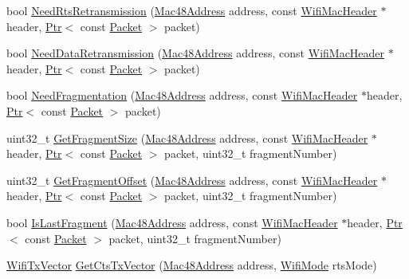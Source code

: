 \begin{DoxyCompactItemize}
\item 
bool \hyperlink{classns3_1_1WifiRemoteStationManager_aca800de3a5d9c62f17ddf1ffb702f105}{Need\+Rts\+Retransmission} (\hyperlink{classns3_1_1Mac48Address}{Mac48\+Address} address, const \hyperlink{classns3_1_1WifiMacHeader}{Wifi\+Mac\+Header} $\ast$header, \hyperlink{classns3_1_1Ptr}{Ptr}$<$ const \hyperlink{classns3_1_1Packet}{Packet} $>$ packet)
\item 
bool \hyperlink{classns3_1_1WifiRemoteStationManager_a7f47c104a6e3f80732c61dec885f509e}{Need\+Data\+Retransmission} (\hyperlink{classns3_1_1Mac48Address}{Mac48\+Address} address, const \hyperlink{classns3_1_1WifiMacHeader}{Wifi\+Mac\+Header} $\ast$header, \hyperlink{classns3_1_1Ptr}{Ptr}$<$ const \hyperlink{classns3_1_1Packet}{Packet} $>$ packet)
\item 
bool \hyperlink{classns3_1_1WifiRemoteStationManager_a42ff3d9a0bf8c3e612271a317aa052be}{Need\+Fragmentation} (\hyperlink{classns3_1_1Mac48Address}{Mac48\+Address} address, const \hyperlink{classns3_1_1WifiMacHeader}{Wifi\+Mac\+Header} $\ast$header, \hyperlink{classns3_1_1Ptr}{Ptr}$<$ const \hyperlink{classns3_1_1Packet}{Packet} $>$ packet)
\item 
uint32\+\_\+t \hyperlink{classns3_1_1WifiRemoteStationManager_ae646308621e90ca3ae6ca6de3540cff2}{Get\+Fragment\+Size} (\hyperlink{classns3_1_1Mac48Address}{Mac48\+Address} address, const \hyperlink{classns3_1_1WifiMacHeader}{Wifi\+Mac\+Header} $\ast$header, \hyperlink{classns3_1_1Ptr}{Ptr}$<$ const \hyperlink{classns3_1_1Packet}{Packet} $>$ packet, uint32\+\_\+t fragment\+Number)
\item 
uint32\+\_\+t \hyperlink{classns3_1_1WifiRemoteStationManager_a3bc4865736b8b3a8f593325bb2bdb655}{Get\+Fragment\+Offset} (\hyperlink{classns3_1_1Mac48Address}{Mac48\+Address} address, const \hyperlink{classns3_1_1WifiMacHeader}{Wifi\+Mac\+Header} $\ast$header, \hyperlink{classns3_1_1Ptr}{Ptr}$<$ const \hyperlink{classns3_1_1Packet}{Packet} $>$ packet, uint32\+\_\+t fragment\+Number)
\item 
bool \hyperlink{classns3_1_1WifiRemoteStationManager_af88757b4d170e2aa444f8922c3b90503}{Is\+Last\+Fragment} (\hyperlink{classns3_1_1Mac48Address}{Mac48\+Address} address, const \hyperlink{classns3_1_1WifiMacHeader}{Wifi\+Mac\+Header} $\ast$header, \hyperlink{classns3_1_1Ptr}{Ptr}$<$ const \hyperlink{classns3_1_1Packet}{Packet} $>$ packet, uint32\+\_\+t fragment\+Number)
\item 
\hyperlink{classns3_1_1WifiTxVector}{Wifi\+Tx\+Vector} \hyperlink{classns3_1_1WifiRemoteStationManager_ab19cddba368c52aae1b48cd7db0ddd61}{Get\+Cts\+Tx\+Vector} (\hyperlink{classns3_1_1Mac48Address}{Mac48\+Address} address, \hyperlink{classns3_1_1WifiMode}{Wifi\+Mode} rts\+Mode)

\end{DoxyCompactItemize}
